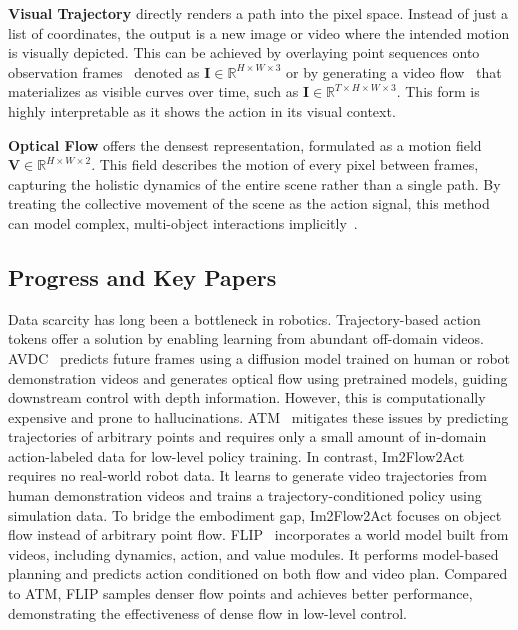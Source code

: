 \documentclass[10pt, a4paper, logo, copyright]{googledeepmind} %
\begin{document}
\textbf{Visual Trajectory} directly renders a path into the pixel space. Instead of just a list of coordinates, the output is a new image or video where the intended motion is visually depicted. This can be achieved by overlaying point sequences onto observation frames~\cite{li2025hamster, rt-trajectory} denoted as $\mathbf{I} \in \mathbb{R}^{H\times W\times 3}$ or by generating a video flow~\cite{xu2024flow} that materializes as visible curves over time, such as $\mathbf{I} \in \mathbb{R}^{T\times H\times W\times 3}$. This form is highly interpretable as it shows the action in its visual context.

\textbf{Optical Flow} offers the densest representation, formulated as a motion field $\mathbf{V}\in\mathbb{R}^{H\times W\times 2}$. This field describes the motion of every pixel between frames, capturing the holistic dynamics of the entire scene rather than a single path. By treating the collective movement of the scene as the action signal, this method can model complex, multi-object interactions implicitly~\cite{ko2023avdc, yao2025thinksmallactbig}.



\subsection{Progress and Key Papers}


Data scarcity has long been a bottleneck in robotics. Trajectory-based action tokens offer a solution by enabling learning from abundant off-domain videos. AVDC~\cite{ko2023avdc} predicts future frames using a diffusion model trained on human or robot demonstration videos and generates optical flow using pretrained models, guiding downstream control with depth information. However, this is computationally expensive and prone to hallucinations. ATM~\cite{wen2023any} mitigates these issues by predicting trajectories of arbitrary points and requires only a small amount of in-domain action-labeled data for low-level policy training. In contrast, Im2Flow2Act~\cite{xu2024flow} requires no real-world robot data. It learns to generate video trajectories from human demonstration videos and trains a trajectory-conditioned policy using simulation data. To bridge the embodiment gap, Im2Flow2Act focuses on object flow instead of arbitrary point flow. FLIP~\cite{flip} incorporates a world model built from videos, including dynamics, action, and value modules. It performs model-based planning and predicts action conditioned on both flow and video plan. Compared to ATM, FLIP samples denser flow points and achieves better performance, demonstrating the effectiveness of dense flow in low-level control.
\end{document}
